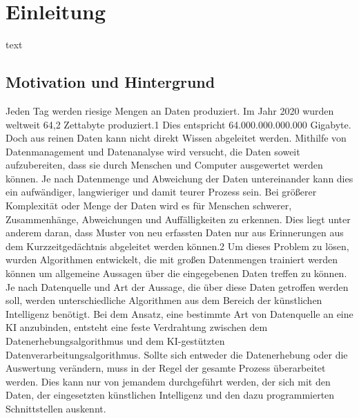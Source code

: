 \section{Einleitung}
text
\subsection{Motivation und Hintergrund}
Jeden Tag werden riesige Mengen an Daten produziert. Im Jahr 2020 wurden weltweit
64,2 Zettabyte produziert.1 Dies entspricht 64.000.000.000.000 Gigabyte. Doch aus reinen
Daten kann nicht direkt Wissen abgeleitet werden. Mithilfe von Datenmanagement
und Datenanalyse wird versucht, die Daten soweit aufzubereiten, dass sie durch Menschen
und Computer ausgewertet werden können. Je nach Datenmenge und Abweichung
der Daten untereinander kann dies ein aufwändiger, langwieriger und damit teurer Prozess
sein. Bei größerer Komplexität oder Menge der Daten wird es für Menschen schwerer,
Zusammenhänge, Abweichungen und Auffälligkeiten zu erkennen. Dies liegt unter
anderem daran, dass Muster von neu erfassten Daten nur aus Erinnerungen aus dem
Kurzzeitgedächtnis abgeleitet werden können.2 Um dieses Problem zu lösen, wurden
Algorithmen entwickelt, die mit großen Datenmengen trainiert werden können um allgemeine
Aussagen über die eingegebenen Daten treffen zu können. Je nach Datenquelle
und Art der Aussage, die über diese Daten getroffen werden soll, werden unterschiedliche
Algorithmen aus dem Bereich der künstlichen Intelligenz benötigt. Bei dem Ansatz, eine
bestimmte Art von Datenquelle an eine KI anzubinden, entsteht eine feste Verdrahtung
zwischen dem Datenerhebungsalgorithmus und dem KI-gestützten Datenverarbeitungsalgorithmus.
Sollte sich entweder die Datenerhebung oder die Auswertung verändern,
muss in der Regel der gesamte Prozess überarbeitet werden. Dies kann nur von jemandem
durchgeführt werden, der sich mit den Daten, der eingesetzten künstlichen Intelligenz
und den dazu programmierten Schnittstellen auskennt.

